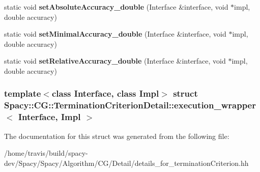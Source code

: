 \begin{DoxyCompactItemize}
\item 
\hypertarget{structSpacy_1_1CG_1_1TerminationCriterionDetail_1_1execution__wrapper_ade83b541f216ff37c91df3a48437dbfc}{static void {\bfseries set\-Absolute\-Accuracy\-\_\-double} (\-Interface \&interface, void $\ast$impl, double accuracy)}\label{structSpacy_1_1CG_1_1TerminationCriterionDetail_1_1execution__wrapper_ade83b541f216ff37c91df3a48437dbfc}

\item 
\hypertarget{structSpacy_1_1CG_1_1TerminationCriterionDetail_1_1execution__wrapper_a25992f57a542d1c26943d4d99c3087e0}{static void {\bfseries set\-Minimal\-Accuracy\-\_\-double} (\-Interface \&interface, void $\ast$impl, double accuracy)}\label{structSpacy_1_1CG_1_1TerminationCriterionDetail_1_1execution__wrapper_a25992f57a542d1c26943d4d99c3087e0}

\item 
\hypertarget{structSpacy_1_1CG_1_1TerminationCriterionDetail_1_1execution__wrapper_aedb040daabef6a43fa08413249783934}{static void {\bfseries set\-Relative\-Accuracy\-\_\-double} (\-Interface \&interface, void $\ast$impl, double accuracy)}\label{structSpacy_1_1CG_1_1TerminationCriterionDetail_1_1execution__wrapper_aedb040daabef6a43fa08413249783934}

\end{DoxyCompactItemize}
\subsubsection*{template$<$class Interface, class Impl$>$ struct Spacy\-::\-C\-G\-::\-Termination\-Criterion\-Detail\-::execution\-\_\-wrapper$<$ Interface, Impl $>$}



\-The documentation for this struct was generated from the following file\-:\begin{DoxyCompactItemize}
\item 
/home/travis/build/spacy-\/dev/\-Spacy/\-Spacy/\-Algorithm/\-C\-G/\-Detail/details\-\_\-for\-\_\-termination\-Criterion.\-hh\end{DoxyCompactItemize}
